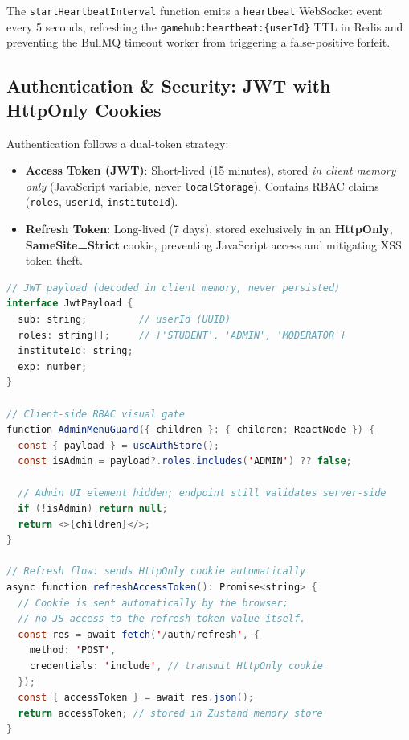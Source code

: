 \documentclass[11pt,a4paper]{report}
\begin{document}
The \texttt{startHeartbeatInterval} function emits a \texttt{heartbeat} WebSocket event every 5 seconds, refreshing the \texttt{gamehub:heartbeat:\{userId\}} TTL in Redis and preventing the BullMQ timeout worker from triggering a false-positive forfeit.

\subsection{Authentication \& Security: JWT with HttpOnly Cookies}

Authentication follows a dual-token strategy:

\begin{itemize}
  \item \textbf{Access Token (JWT)}: Short-lived (15 minutes), stored \emph{in client memory only} (JavaScript variable, never \texttt{localStorage}). Contains RBAC claims (\texttt{roles}, \texttt{userId}, \texttt{instituteId}).
  \item \textbf{Refresh Token}: Long-lived (7 days), stored exclusively in an \textbf{HttpOnly}, \textbf{SameSite=Strict} cookie, preventing JavaScript access and mitigating XSS token theft.
\end{itemize}

\begin{lstlisting}[language=Java, caption={JWT claims structure and client-side RBAC check}]
// JWT payload (decoded in client memory, never persisted)
interface JwtPayload {
  sub: string;         // userId (UUID)
  roles: string[];     // ['STUDENT', 'ADMIN', 'MODERATOR']
  instituteId: string;
  exp: number;
}

// Client-side RBAC visual gate
function AdminMenuGuard({ children }: { children: ReactNode }) {
  const { payload } = useAuthStore();
  const isAdmin = payload?.roles.includes('ADMIN') ?? false;

  // Admin UI element hidden; endpoint still validates server-side
  if (!isAdmin) return null;
  return <>{children}</>;
}

// Refresh flow: sends HttpOnly cookie automatically
async function refreshAccessToken(): Promise<string> {
  // Cookie is sent automatically by the browser;
  // no JS access to the refresh token value itself.
  const res = await fetch('/auth/refresh', {
    method: 'POST',
    credentials: 'include', // transmit HttpOnly cookie
  });
  const { accessToken } = await res.json();
  return accessToken; // stored in Zustand memory store
}
\end{lstlisting}
\end{document}
